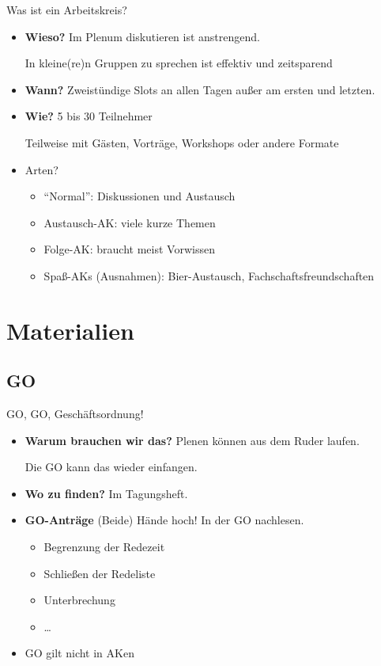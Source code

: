 \documentclass[compress,]{beamer}
\begin{document}
\begin{frame}{Was ist ein Arbeitskreis?}

  \begin{itemize}[<+->]
  \item \textbf{Wieso?} Im Plenum diskutieren ist anstrengend.

    In kleine(re)n Gruppen zu sprechen ist effektiv und zeitsparend
  \item \textbf{Wann?} Zweistündige Slots an allen Tagen außer am ersten und letzten.
  \item \textbf{Wie?} 5 bis 30 Teilnehmer

    Teilweise mit Gästen, Vorträge, Workshops oder andere Formate
  \item Arten?
    \begin{itemize}[<+->]
    \item ``Normal'': Diskussionen und Austausch
    \item Austausch-AK: viele kurze Themen
    \item Folge-AK: braucht meist Vorwissen
    \item Spaß-AKs (Ausnahmen): Bier-Austausch, Fachschaftsfreundschaften
    \end{itemize}
  \end{itemize}

\end{frame}


\section{Materialien}

\subsection{GO}

\begin{frame}{GO, GO, Geschäftsordnung!}

  \begin{itemize}[<+->]
  \item<1-> \textbf{Warum brauchen wir das?} Plenen können aus dem Ruder
    laufen.

    Die GO kann das wieder einfangen.
  \item<2-> \textbf{Wo zu finden?} Im Tagungsheft.
  \item<3-> \textbf{GO-Anträge} (Beide) Hände hoch! In der GO nachlesen.

    \begin{itemize}
    \item<5-> Begrenzung der Redezeit
    \item<6-> Schließen der Redeliste
    \item<7-> Unterbrechung
    \item<8-> \ldots
    \end{itemize}
  \item<9-> GO gilt nicht in AKen
  \end{itemize}

\end{frame}
\end{document}
